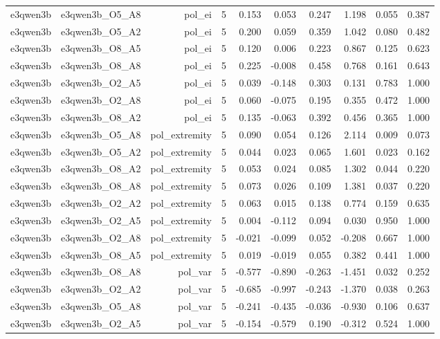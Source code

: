 \documentclass[11pt]{article}
\begin{document}
\begin{landscape}
\begin{longtable}{@{}lrrrrrrrrr@{}}
e3qwen3b & e3qwen3b\_O5\_A8 & pol\_ei & 5 & 0.153 & 0.053 & 0.247 & 1.198 & 0.055 & 0.387 \\
e3qwen3b & e3qwen3b\_O5\_A2 & pol\_ei & 5 & 0.200 & 0.059 & 0.359 & 1.042 & 0.080 & 0.482 \\
e3qwen3b & e3qwen3b\_O8\_A5 & pol\_ei & 5 & 0.120 & 0.006 & 0.223 & 0.867 & 0.125 & 0.623 \\
e3qwen3b & e3qwen3b\_O8\_A8 & pol\_ei & 5 & 0.225 & -0.008 & 0.458 & 0.768 & 0.161 & 0.643 \\
e3qwen3b & e3qwen3b\_O2\_A5 & pol\_ei & 5 & 0.039 & -0.148 & 0.303 & 0.131 & 0.783 & 1.000 \\
e3qwen3b & e3qwen3b\_O2\_A8 & pol\_ei & 5 & 0.060 & -0.075 & 0.195 & 0.355 & 0.472 & 1.000 \\
e3qwen3b & e3qwen3b\_O8\_A2 & pol\_ei & 5 & 0.135 & -0.063 & 0.392 & 0.456 & 0.365 & 1.000 \\
e3qwen3b & e3qwen3b\_O5\_A8 & pol\_extremity & 5 & 0.090 & 0.054 & 0.126 & 2.114 & 0.009 & 0.073 \\
e3qwen3b & e3qwen3b\_O5\_A2 & pol\_extremity & 5 & 0.044 & 0.023 & 0.065 & 1.601 & 0.023 & 0.162 \\
e3qwen3b & e3qwen3b\_O8\_A2 & pol\_extremity & 5 & 0.053 & 0.024 & 0.085 & 1.302 & 0.044 & 0.220 \\
e3qwen3b & e3qwen3b\_O8\_A8 & pol\_extremity & 5 & 0.073 & 0.026 & 0.109 & 1.381 & 0.037 & 0.220 \\
e3qwen3b & e3qwen3b\_O2\_A2 & pol\_extremity & 5 & 0.063 & 0.015 & 0.138 & 0.774 & 0.159 & 0.635 \\
e3qwen3b & e3qwen3b\_O2\_A5 & pol\_extremity & 5 & 0.004 & -0.112 & 0.094 & 0.030 & 0.950 & 1.000 \\
e3qwen3b & e3qwen3b\_O2\_A8 & pol\_extremity & 5 & -0.021 & -0.099 & 0.052 & -0.208 & 0.667 & 1.000 \\
e3qwen3b & e3qwen3b\_O8\_A5 & pol\_extremity & 5 & 0.019 & -0.019 & 0.055 & 0.382 & 0.441 & 1.000 \\
e3qwen3b & e3qwen3b\_O8\_A8 & pol\_var & 5 & -0.577 & -0.890 & -0.263 & -1.451 & 0.032 & 0.252 \\
e3qwen3b & e3qwen3b\_O2\_A2 & pol\_var & 5 & -0.685 & -0.997 & -0.243 & -1.370 & 0.038 & 0.263 \\
e3qwen3b & e3qwen3b\_O5\_A8 & pol\_var & 5 & -0.241 & -0.435 & -0.036 & -0.930 & 0.106 & 0.637 \\
e3qwen3b & e3qwen3b\_O2\_A5 & pol\_var & 5 & -0.154 & -0.579 & 0.190 & -0.312 & 0.524 & 1.000 \\

\end{longtable}
\end{landscape}
\end{document}
